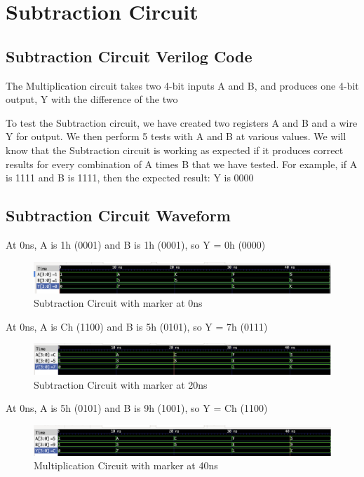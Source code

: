 \documentclass[12pt]{article}
\begin{document}
\section{Subtraction Circuit}
\subsection{Subtraction Circuit Verilog Code} 
The Multiplication circuit takes two 4-bit inputs A and B, and produces one 4-bit output, Y with the difference of the two
 

To test the Subtraction circuit, we have created two registers A and B and a wire Y for output. We then perform 5 tests with A and B at various values. We will know that the Subtraction circuit is working as expected if it produces correct results for every combination of A times B that we have tested. For example, if A is 1111 and B is 1111, then the expected result: Y is 0000

\subsection{Subtraction Circuit Waveform} 

At 0ns, A is 1h (0001) and B is 1h (0001), so Y = 0h (0000)  
\begin{figure}[H]
 \centering
 \includegraphics[width = 1.0\textwidth]{Subtraction/Subtraction-0ns.png}
 \caption{Subtraction Circuit with marker at 0ns}
 \label{fig:enter-label} 
\end{figure} 

At 0ns, A is Ch (1100) and B is 5h (0101), so Y = 7h (0111)  
 \begin{figure}[H]
 \centering 
\includegraphics[width = 1.0\textwidth]{Subtraction/Subtraction-20ns.png}
 \caption{Subtraction Circuit with marker at 20ns}
 \label{fig:enter-label}
 \end{figure}

 At 0ns, A is 5h (0101) and B is 9h (1001), so Y = Ch (1100)  
 \begin{figure}[H]
 \centering 
\includegraphics[width = 1.0\textwidth]{Subtraction/Subtraction-40ns.png}
 \caption{Multiplication Circuit with marker at 40ns}
 \label{fig:enter-label}
 \end{figure}
\end{document}
